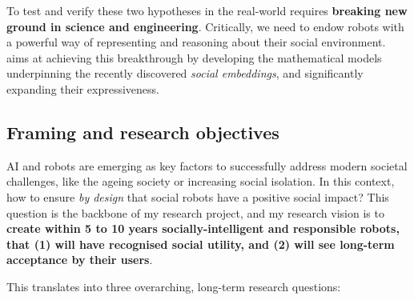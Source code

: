 To test and verify these two hypotheses in the real-world requires
\textbf{breaking new ground in science and engineering}. Critically, we need to
endow robots with a powerful way of representing and reasoning about their
social environment.  \project aims at achieving this breakthrough by developing
the mathematical models underpinning the recently discovered \emph{social
embeddings}, and significantly expanding their expressiveness.


\subsection{Framing and research objectives}

AI and robots are emerging as key factors to successfully address modern societal
challenges, like the ageing society or increasing social isolation. In this context, how to
ensure \emph{by design} that social robots have a positive social impact?
This question is the backbone of my research project, and my research vision
is to \textbf{create within 5 to 10 years socially-intelligent and responsible robots,
that (1) will have recognised social utility, and (2) will see long-term
acceptance by their users}.
%

\vspace{0.4em}



This translates into three overarching, long-term research questions:

